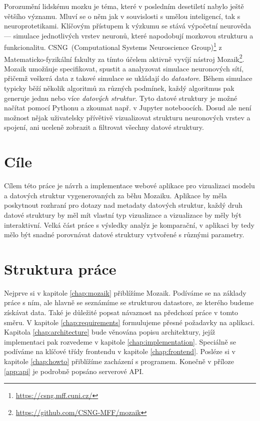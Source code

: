 

Porozumění lidskému mozku je téma, které v posledním desetiletí nabylo ještě většího významu. Mluví se o něm jak v souvislosti s umělou inteligencí, tak s neuroprotetikami. Klíčovým přístupem k výzkumu se stává výpočetní neurověda --- simulace jednotlivých vrstev neuronů, které napodobují mozkovou strukturu a funkcionalitu. CSNG~(Computational Systems Neuroscience Group)\footnote{\url{https://csng.mff.cuni.cz/}} z Matematicko-fyzikální fakulty za tímto účelem aktivně vyvíjí nástroj Mozaik\footnote{\url{https://github.com/CSNG-MFF/mozaik}}. Mozaik umožňuje specifikovat, spustit a analyzovat simulace neuronových sítí, přičemž veškerá data z takové simulace se ukládají do \emph{datastore}. Během simulace typicky běží několik algoritmů za různých podmínek, každý algoritmus pak generuje jednu nebo více \emph{datových struktur}. Tyto datové struktury je možné načítat pomocí Pythonu a zkoumat např. v Jupyter noteboocích. Dosud ale není možnost nějak uživatelsky přívětivě vizualizovat strukturu neuronových vrstev a spojení, ani uceleně zobrazit a filtrovat všechny datové struktury.

\section*{Cíle}

Cílem této práce je návrh a implementace webové aplikace pro vizualizaci modelu a datových struktur vygenerovaných za běhu Mozaiku. Aplikace by měla poskytnout rozhraní pro dotazy nad metadaty datových struktur, každý druh datové struktury by měl mít vlastní typ vizualizace a vizualizace by měly být interaktivní. Velká část práce s výsledky analýz je komparační, v aplikaci by tedy mělo být snadné porovnávat datové struktury vytvořené s různými parametry.

\section*{Struktura práce}

Nejprve si v kapitole \ref{chap:mozaik} přiblížíme Mozaik. Podíváme se na základy práce s ním, ale hlavně se seznámíme se strukturou datastore, ze kterého budeme získávat data. Také je důležité popsat návaznost na předchozí práce v tomto směru. V kapitole \ref{chap:requirements} formulujeme přesné požadavky na aplikaci. Kapitola \ref{chap:architecture} bude věnována popisu architektury, jejíž implementaci pak rozvedeme v kapitole \ref{chap:implementation}. Speciálně se podíváme na klíčové třídy frontendu v kapitole \ref{chap:frontend}. Posléze si v kapitole \ref{chap:howto} přiblížíme zacházení s programem. Konečně v příloze \ref{app:api} je podrobně popsáno serverové API.
